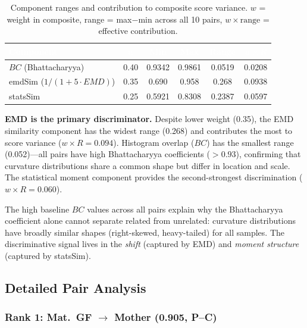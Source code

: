 \documentclass{../yalumba}
\begin{document}
\begin{table}[H]
  \centering
  \tablestyle
  \caption{Component ranges and contribution to composite score variance.
    $w$ = weight in composite, range = max$-$min across all 10 pairs,
    $w \times \text{range}$ = effective contribution.}
  \label{tab:component-analysis}
  \begin{tabular}{lccccc}
    \toprule
    \rowcolor{table-header}
    \textcolor{white}{\textbf{Component}} &
    \textcolor{white}{\textbf{$w$}} &
    \textcolor{white}{\textbf{Min}} &
    \textcolor{white}{\textbf{Max}} &
    \textcolor{white}{\textbf{Range}} &
    \textcolor{white}{\textbf{$w \times R$}} \\
    \midrule
    $BC$ (Bhattacharyya)
      & 0.40 & 0.9342 & 0.9861 & 0.0519 & 0.0208 \\
    emdSim ($1/(1+5\cdot EMD)$)
      & 0.35 & 0.690 & 0.958 & 0.268 & 0.0938 \\
    statsSim
      & 0.25 & 0.5921 & 0.8308 & 0.2387 & 0.0597 \\
    \bottomrule
  \end{tabular}
\end{table}

\begin{keyfinding}
\textbf{EMD is the primary discriminator.}  Despite lower weight (0.35),
the EMD similarity component has the widest range (0.268) and contributes
the most to score variance ($w \times R = 0.094$).  Histogram overlap
($BC$) has the smallest range (0.052)---all pairs have high Bhattacharyya
coefficients ($> 0.93$), confirming that curvature distributions share a
common shape but differ in location and scale.  The statistical moment
component provides the second-strongest discrimination ($w \times R =
0.060$).
\end{keyfinding}

The high baseline $BC$ values across all pairs explain why the Bhattacharyya
coefficient alone cannot separate related from unrelated: curvature
distributions have broadly similar shapes (right-skewed, heavy-tailed) for
all samples.  The discriminative signal lives in the \emph{shift} (captured
by EMD) and \emph{moment structure} (captured by statsSim).

\subsection{Detailed Pair Analysis}

\subsubsection{Rank 1: Mat.~GF $\to$ Mother (0.905, P--C)}
\end{document}
